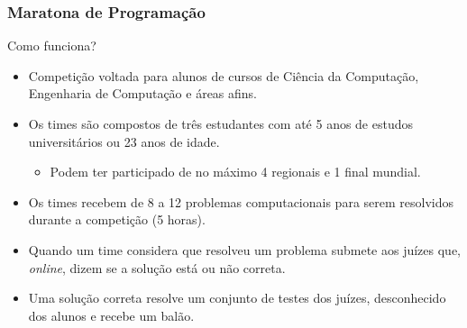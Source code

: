 
\begin{frame}
\frametitle{Maratona de Programação}
\begin{block}{Como funciona?}
\begin{itemize}
	\item Competição voltada para alunos de cursos de Ciência da Computação, Engenharia de Computação e áreas afins.
	\item Os times são compostos de três estudantes com até 5 anos de estudos universitários ou 23 anos de idade.
	\begin{itemize}
		\item Podem ter participado de no máximo 4 regionais e 1 final mundial.
	\end{itemize}
	\item Os times recebem de 8 a 12 problemas computacionais para serem resolvidos durante a competição (5 horas).
	\item Quando um time considera que resolveu um problema submete aos juízes que, {\em online}, dizem se a solução está ou não correta.
	\item Uma solução correta resolve um conjunto de testes dos juízes, desconhecido dos alunos e recebe um balão.
\end{itemize}
\end{block}
\end{frame}

